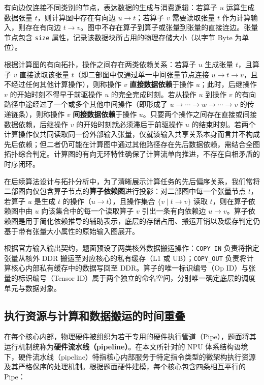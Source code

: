 \documentclass[anonymous,notoc]{gmcm2026}
\begin{document}
有向边仅连接不同类别的节点，表达数据的生成与消费逻辑：若算子 \(u\) 运算生成数据张量 \(t\)，则计算图中存在有向边 \(u \to t\)；若算子 \(v\) 需要读取张量 \(t\) 作为计算输入，则存在有向边 \(t \to v\)。图中不存在算子到算子或张量到张量的直接连边。张量节点包含 \texttt{size} 属性，记录该数据块所占用的物理存储大小（以字节 Byte 为单位）。

根据计算图的有向拓扑，操作之间存在两类依赖关系：若算子 \(u\) 生成张量 \(t\)，且算子 \(v\) 直接读取该张量 \(t\)（即二部图中仅通过单一中间张量节点连接 \(u \to t \to v\)，且不经过任何其他计算操作），则称操作 \(v\) \textbf{直接数据依赖}于操作 \(u\)；此时，后继操作 \(v\) 的开始时刻不得早于前驱操作 \(u\) 的完全完成时刻。若从操作 \(u\) 到操作 \(v\) 的有向路径中途经过了一个或多个其他中间操作（即形成了 \(u \to \cdots \to w \to \cdots \to v\) 的传递链条），则称操作 \(v\) \textbf{间接数据依赖}于操作 \(u\)。只要两个操作之间存在直接或间接数据依赖，后继操作 \(v\) 的开始时刻就必须滞后于前驱操作 \(u\) 的结束时刻。若两个计算操作仅共同读取同一份外部输入张量，仅就该输入共享关系本身而言并不构成先后依赖；但二者仍可能在计算图中通过其他路径存在先后数据依赖，需结合全图拓扑综合判定。计算图的有向无环特性确保了计算流单向推进，不存在自相矛盾的时序闭环。

在后续算法设计与拓扑分析中，为了清晰展示计算任务的先后偏序关系，我们常将二部图向仅包含算子节点的\textbf{算子依赖图}进行投影：对二部图中每一个张量节点 \(t\)，若算子 \(u\) 是生成 \(t\) 的操作（\(u \to t\)），且操作集合 \(\{v \mid t \to v\}\) 读取 \(t\)，则在算子依赖图中由 \(u\) 向该集合中的每一个读取算子 \(v\) 引出一条有向依赖边 \(u \to v\)。算子依赖图是用于简化依赖推导的辅助表示，底层的存储占用、搬运开销以及缓存判定仍基于带有张量大小属性的原始输入图展开。

根据官方输入输出契约，题面预设了两类核外数据搬运操作：\texttt{COPY\_IN} 负责将指定张量从核外 DDR 搬运至对应核心的私有缓存（L1 或 UB）；\texttt{COPY\_OUT} 负责将计算核心内部私有缓存中的数据写回至 DDR。算子的唯一标识编号（Op ID）与张量的标识编号（Tensor ID）属于两个独立的命名空间，分别唯一确定底层的调度单元与数据对象。

\subsection{执行资源与计算和数据搬运的时间重叠}

在每个核心内部，物理硬件被组织为若干专用的硬件执行管道（Pipe），题面将其运行机制统称为\textbf{硬件流水线（pipeline）}。在本文所针对的 NPU 体系结构语境下，硬件流水线（pipeline）特指核心内部服务于特定指令类型的微架构执行资源及其严格保序的处理机制。根据题面硬件建模，每个核心包含四条相互平行的 Pipe：
\end{document}
